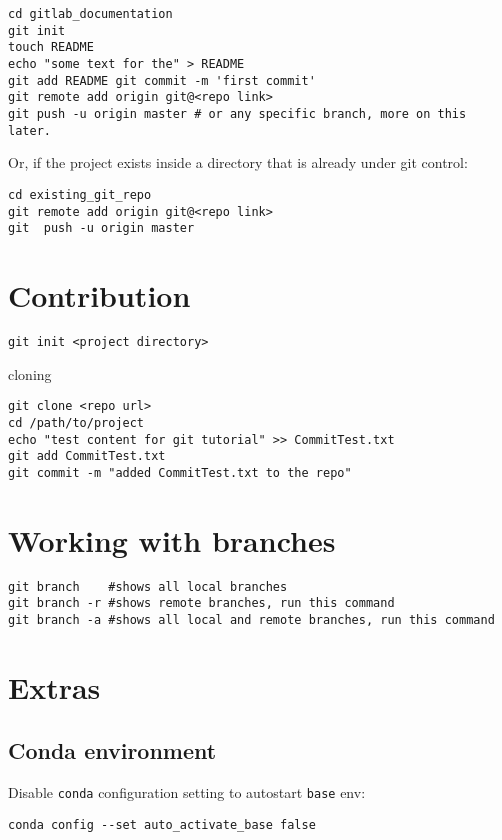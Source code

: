 \documentclass[11pt]{article}
\newcommand{\nextdiv}{\vspace{2mm}\noindent}
\begin{document}
\begin{lstlisting}
cd gitlab_documentation
git init
touch README
echo "some text for the" > README 
git add README git commit -m 'first commit'  
git remote add origin git@<repo link>  
git push -u origin master # or any specific branch, more on this later.
\end{lstlisting}

\nextdiv
Or, if the project exists inside a directory that is already under git control:

\begin{lstlisting}
cd existing_git_repo
git remote add origin git@<repo link>
git  push -u origin master
\end{lstlisting}

\section*{Contribution}
\begin{lstlisting}
git init <project directory>
\end{lstlisting}

cloning

\begin{lstlisting}
git clone <repo url>
cd /path/to/project 
echo "test content for git tutorial" >> CommitTest.txt 
git add CommitTest.txt 
git commit -m "added CommitTest.txt to the repo"
\end{lstlisting}


\section*{Working with branches}
\begin{lstlisting}
git branch    #shows all local branches
git branch -r #shows remote branches, run this command
git branch -a #shows all local and remote branches, run this command
\end{lstlisting}

\section*{Extras}

\subsection*{Conda environment}

Disable \texttt{conda} configuration setting to autostart \texttt{base} env:
\begin{lstlisting}
conda config --set auto_activate_base false
\end{lstlisting}
\end{document}
